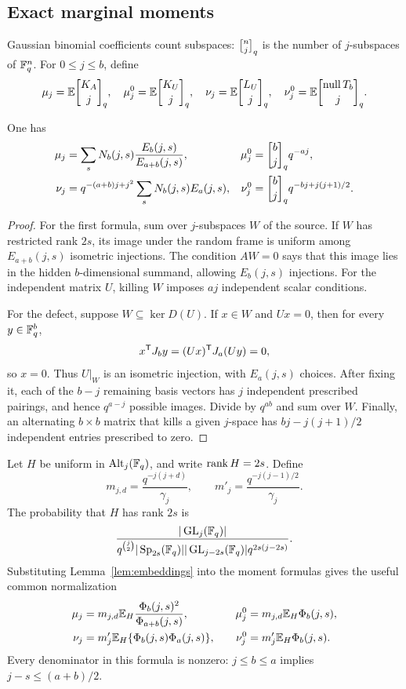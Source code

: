 \subsection{Exact marginal moments}

Gaussian binomial coefficients count subspaces:
\(\qbin{n}{j}\) is the number of \(j\)-subspaces of \(\mathbb F_q^n\).
For \(0\le j\le b\), define
\[
 \mu_j=\E\qbin{K_A}{j},\quad
 \mu_j^0=\E\qbin{K_U}{j},\quad
 \nu_j=\E\qbin{L_U}{j},\quad
 \nu_j^0=\E\qbin{\nul T_b}{j}.
\]

\begin{lemma}\label{lem:moments}
One has
\begin{align}
 \mu_j
 &=\sum_s N_b(j,s)\frac{E_b(j,s)}{E_{a+b}(j,s)},
 & \mu_j^0&=\qbin b j q^{-aj},\label{eq:rank-moments-raw}\\
 \nu_j
 &=q^{-(a+b)j+j^2}\sum_sN_b(j,s)E_a(j,s),
 & \nu_j^0&=\qbin b j q^{-bj+j(j+1)/2}.
 \label{eq:defect-moments-raw}
\end{align}
\end{lemma}

\begin{proof}
For the first formula, sum over \(j\)-subspaces \(W\) of the source.
If \(W\) has restricted rank \(2s\), its image under the random frame
is uniform among \(E_{a+b}(j,s)\) isometric injections.
The condition \(AW=0\) says that this image lies in the hidden
\(b\)-dimensional summand, allowing \(E_b(j,s)\) injections.
For the independent matrix \(U\), killing \(W\) imposes \(aj\)
independent scalar conditions.

For the defect, suppose \(W\subseteq\ker D(U)\). If \(x\in W\) and
\(Ux=0\), then for every \(y\in\mathbb F_q^b\),
\[
 x^{\mathsf T}J_by=(Ux)^{\mathsf T}J_a(Uy)=0,
\]
so \(x=0\). Thus \(U|_W\) is an isometric injection, with \(E_a(j,s)\)
choices. After fixing it, each of the \(b-j\) remaining basis vectors
has \(j\) independent prescribed pairings, and hence \(q^{a-j}\)
possible images. Divide by \(q^{ab}\) and sum over \(W\).
Finally, an alternating \(b\times b\) matrix that kills a given
\(j\)-space has \(bj-j(j+1)/2\) independent entries prescribed to zero.
\end{proof}

Let \(H\) be uniform in \(\operatorname{Alt}_j(\mathbb F_q)\), and write \(\operatorname{rank} H=2s\).
Define
\[
 m_{j,d}=\frac{q^{-j(j+d)}}{\gamma_j},\qquad
 m'_j=\frac{q^{-j(j-1)/2}}{\gamma_j}.
\]
The probability that \(H\) has rank \(2s\) is
\[
 \frac{|\operatorname{GL}_j(\mathbb F_q)|}
 {q^{\binom j2}|\operatorname{Sp}_{2s}(\mathbb F_q)|
       |\operatorname{GL}_{j-2s}(\mathbb F_q)|q^{2s(j-2s)}}.
\]
Substituting Lemma~\ref{lem:embeddings} into the moment formulas gives the
useful common normalization
\begin{equation}\label{eq:unified}
 \begin{aligned}
 \mu_j&=m_{j,d}\mathbb E_H\frac{\Phi_b(j,s)^2}{\Phi_{a+b}(j,s)},
 &\quad \mu_j^0&=m_{j,d}\mathbb E_H\Phi_b(j,s),\\
 \nu_j&=m'_j\mathbb E_H\{\Phi_b(j,s)\Phi_a(j,s)\},
 &\quad \nu_j^0&=m'_j\mathbb E_H\Phi_b(j,s).
 \end{aligned}
\end{equation}
Every denominator in this formula is nonzero: \(j\le b\le a\)
implies \(j-s\le(a+b)/2\).

